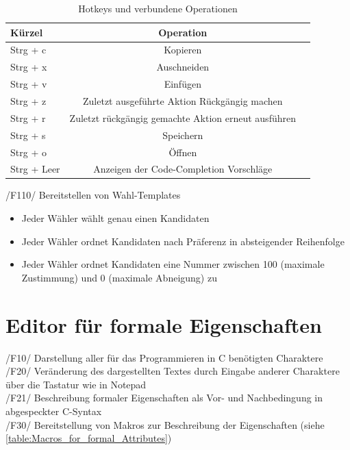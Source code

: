 \documentclass[a4paper]{scrreprt}
\begin{document}
\begin{table}
\caption{Hotkeys und verbundene Operationen}
\begin{tabular}{lcr} 
Kürzel & Operation \\
\hline 
Strg + c & Kopieren \\
Strg + x & Auschneiden \\
Strg + v & Einfügen \\
Strg + z & Zuletzt ausgeführte Aktion Rückgängig machen \\
Strg + r & Zuletzt rückgängig gemachte Aktion erneut ausführen \\
Strg + s & Speichern \\
Strg + o & Öffnen \\
Strg + Leer & Anzeigen der Code-Completion Vorschläge\\
\end{tabular}
\label{table:Hotkeys_and_operations}
\end{table}

/F110/ Bereitstellen von Wahl-Templates
\begin{itemize}
\item Jeder Wähler wählt genau einen Kandidaten
\item Jeder Wähler ordnet Kandidaten nach Präferenz in absteigender Reihenfolge 
\item Jeder Wähler ordnet Kandidaten eine Nummer zwischen 100 (maximale Zustimmung) und 0 (maximale Abneigung) zu 
\end{itemize}
 
\section{Editor für formale Eigenschaften}
/F10/ Darstellung aller für das Programmieren in C benötigten Charaktere \\
/F20/ Veränderung des dargestellten Textes durch Eingabe anderer Charaktere über die  Tastatur wie in Notepad \\
/F21/ Beschreibung formaler Eigenschaften als Vor- und Nachbedingung in abgespeckter C-Syntax\\
/F30/ Bereitstellung von Makros zur Beschreibung der Eigenschaften (siehe \ref{table:Macros_for_formal_Attributes}) \\
\end{document}
